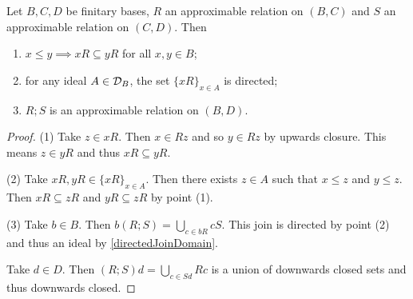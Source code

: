 \begin{lemma} \label{approximableRelationLemma}
Let $B,C,D$ be finitary bases, $R$ an approximable relation on $(B,C)$ and $S$ an approximable relation on $(C,D)$. Then
\begin{enumerate}
\item $x\leq y \implies xR \subseteq yR$ for all $x,y\in B$;
\item for any ideal $A\in\mathcal{D}_B$, the set $\{xR\}_{x\in A}$ is directed;
\item $R;S$ is an approximable relation on $(B,D)$.
\end{enumerate}
\end{lemma}
\begin{proof}
(1) Take $z\in xR$. Then $x\in Rz$ and so $y\in Rz$ by upwards closure. This means $z\in yR$ and thus $xR \subseteq yR$.

(2) Take $xR, yR \in \{xR\}_{x\in A}$. Then there exists $z\in A$ such that $x\leq z$ and $y\leq z$. Then $xR\subseteq zR$ and $yR \subseteq zR$ by point (1).

(3) Take $b\in B$. Then $b(R;S) = \bigcup _{c\in bR}cS$. This join is directed by point (2) and thus an ideal by \ref{directedJoinDomain}.

Take $d\in D$. Then $(R;S)d = \bigcup_{c\in Sd}Rc$ is a union of downwards closed sets and thus downwards closed.
\end{proof}

